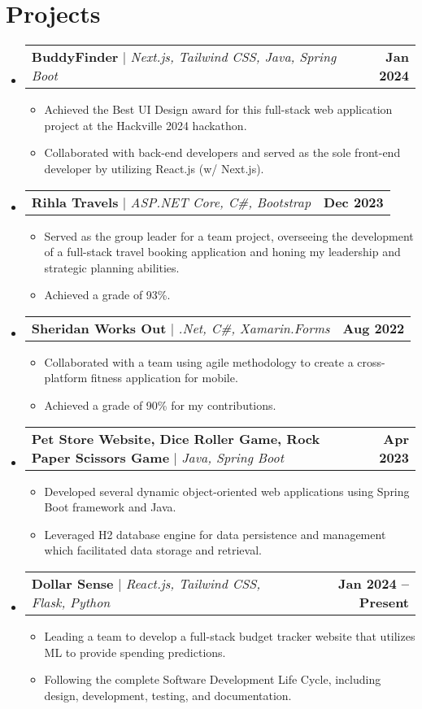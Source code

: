 \documentclass[a4,11pt]{article}
\makeatletter
\newcommand{\resumeItem}[1]{
  \item\small{
    {#1 \vspace{-2pt}}
  }
}
\newcommand{\resumeProjectHeading}[2]{
    \item
    \begin{tabular*}{1.001\textwidth}{l@{\extracolsep{\fill}}r}
      \small#1 & \textbf{\small #2}\\
    \end{tabular*}\vspace{-7pt}
}
\newcommand{\resumeSubHeadingListStart}{\begin{itemize}[leftmargin=0.0in, label={}]}
\newcommand{\resumeSubHeadingListEnd}{\end{itemize}}
\newcommand{\resumeItemListStart}{\begin{itemize}}
\newcommand{\resumeItemListEnd}{\end{itemize}\vspace{-5pt}}
\makeatother
\begin{document}
\section{Projects}
    \vspace{-5pt}
    \resumeSubHeadingListStart
      \resumeProjectHeading
          {\textbf{BuddyFinder} $|$ \emph{Next.js, Tailwind CSS, Java, Spring Boot}}{Jan 2024}
          \resumeItemListStart
            \resumeItem{Achieved the Best UI Design award for this full-stack web application project at the Hackville 2024 hackathon.}
            \resumeItem{Collaborated with back-end developers and served as the sole front-end developer by utilizing React.js (w/ Next.js).}
          \resumeItemListEnd
          \vspace{-13pt}
      \resumeProjectHeading
          {\textbf{Rihla Travels} $|$ \emph{ASP.NET Core, C\#, Bootstrap}}{Dec 2023}
          \resumeItemListStart
            \resumeItem{Served as the group leader for a team project, overseeing the development of a full-stack travel booking application and honing my leadership and strategic planning abilities.}
            \resumeItem{Achieved a grade of 93\%.}
          \resumeItemListEnd
          \vspace{-13pt}
      \resumeProjectHeading
          {\textbf{Sheridan Works Out} $|$ \emph{.Net, C\#, Xamarin.Forms}}{Aug 2022}
          \resumeItemListStart
            \resumeItem{Collaborated with a team using agile methodology to create a cross-platform fitness application for mobile.}
            \resumeItem{Achieved a grade of 90\% for my contributions.}
          \resumeItemListEnd
          \vspace{-13pt}
      \resumeProjectHeading
          {\textbf{Pet Store Website, Dice Roller Game, Rock Paper Scissors Game} $|$ \emph{Java, Spring Boot}}{Apr 2023}
          \resumeItemListStart
            \resumeItem{Developed several dynamic object-oriented web applications using Spring Boot framework and Java.}
            \resumeItem{Leveraged H2 database engine for data persistence and management which facilitated data storage and retrieval.}
          \resumeItemListEnd
          \vspace{-13pt}
      \resumeProjectHeading
          {\textbf{Dollar Sense} $|$ \emph{React.js, Tailwind CSS, Flask, Python}}{Jan 2024 -- Present}
          \resumeItemListStart
            \resumeItem{Leading a team to develop a full-stack budget tracker website that utilizes ML to provide spending predictions.}
            \resumeItem{Following the complete Software Development Life Cycle, including design, development, testing, and documentation.}
          \resumeItemListEnd
    \resumeSubHeadingListEnd
\vspace{-16pt}
\end{document}
